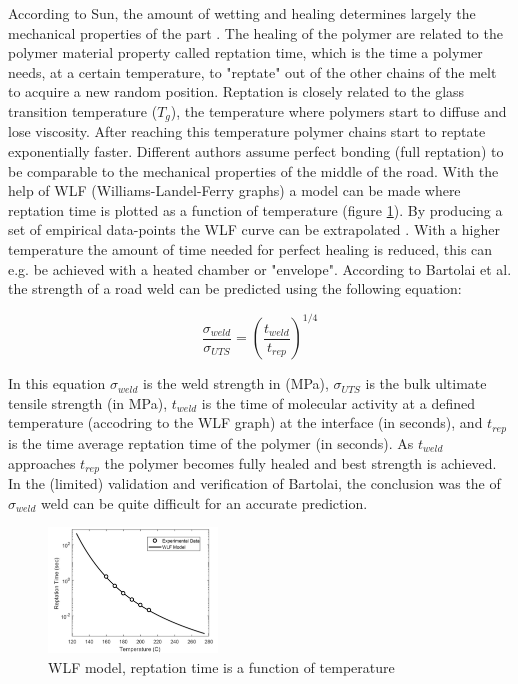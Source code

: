 According to Sun, the amount of wetting and healing determines largely  the mechanical properties of the part \cite{Sun2008}. The healing of the polymer are related to the polymer material property called reptation time, which is the time a polymer needs, at a certain temperature, to "reptate" out of the other chains of the melt to acquire a new random position. Reptation is closely related to the glass transition temperature ($T_g$), the temperature where polymers start to diffuse and lose viscosity. After reaching this temperature polymer chains start to reptate exponentially faster. Different authors \cite{Mcilroy2017DisentanglementManufacturing}  \cite{Hart2018IncreasedAnnealing} \cite{Bartolai2016PredictingManufacturing} assume perfect bonding (full reptation) to be comparable to the mechanical properties of the middle of the road. With the help of WLF (Williams-Landel-Ferry graphs) a model can be made where reptation time is plotted as a function of temperature (figure \ref{fig:WLFreptation}). By producing a set of empirical data-points the WLF curve can be extrapolated \cite{Peterson2019ReviewPerspective}. With a higher temperature the amount of time needed for perfect healing is reduced, this can e.g. be achieved with a heated chamber or "envelope". According to Bartolai et al. \cite{Bartolai2016PredictingManufacturing} the strength of a road weld can be predicted using the following equation:

\begin{equation} \label{eq:weld}
\frac{\sigma_{weld}}{\sigma_{UTS}}=\left(\frac{t_{weld}}{t_{rep}}\right)^{1/4}
\end{equation}

In this equation $\sigma_{weld}$ is the weld strength in (MPa), $\sigma_{UTS}$ is the bulk ultimate tensile strength (in MPa), $t_{weld}$ is the time of molecular activity at a defined temperature (accodring to the WLF graph) at the interface (in seconds), and $t_{rep}$ is the time average reptation time of the polymer (in seconds). As $t_{weld}$ approaches $t_{rep}$ the polymer becomes fully healed and best strength is achieved. In the (limited) validation and verification of Bartolai, the conclusion was the of $\sigma_{weld}$ weld can be quite difficult for an accurate prediction.

\begin{figure}[H]
    \centering
    \includegraphics[width=0.4\textwidth]{chapter_2/figures/WLFreptation.PNG}
    \caption{WLF model, reptation time is a function of temperature \cite{Seppala2017WeldManufacturing}}
    \label{fig:WLFreptation}
\end{figure}

